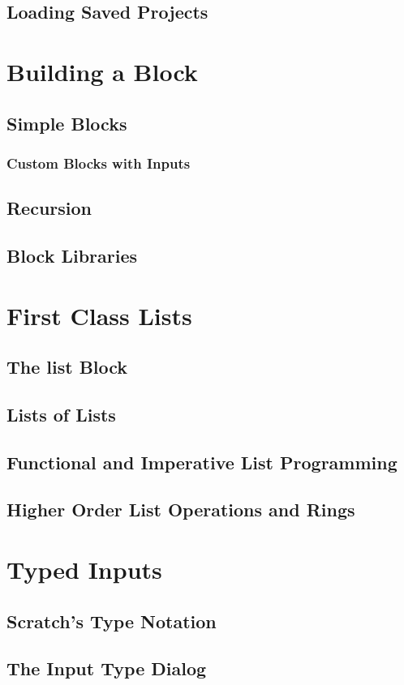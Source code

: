 \documentclass{report}
\begin{document}
\section{Loading Saved Projects}
\chapter{Building a Block}
\section{Simple Blocks}
\subsection{Custom Blocks with Inputs}
\section{Recursion}
\section{Block Libraries}
\chapter{First Class Lists}
\section{The list Block}
\section{Lists of Lists}
\section{Functional and Imperative List Programming}
\section{Higher Order List Operations and Rings}
\chapter{Typed Inputs}
\section{Scratch's Type Notation}
\section{The \Snap{} Input Type Dialog}
\end{document}
